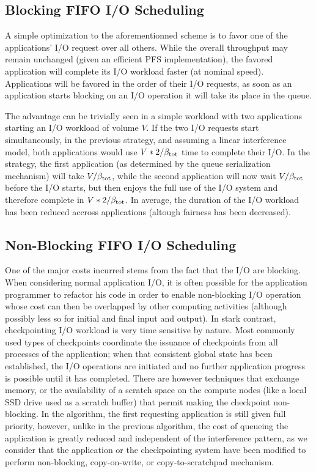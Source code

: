 \subsection{Blocking FIFO I/O Scheduling}

A simple optimization to the aforementionned scheme is to favor one of
the applications' I/O request over all others. While the overall throughput
may remain unchanged (given an efficient PFS implementation), the favored
application will complete its I/O workload faster (at nominal speed).
Applications will be favored in the order of their I/O requests, \ie
as soon as an application starts blocking on an I/O operation it will
take its place in the queue.

The advantage can be trivially seen in a simple workload with two applications
starting an I/O workload of volume $V$. If the two I/O requests
start simultaneously, in the previous strategy, and assuming a linear
interference model, both applications would use $V*2/\beta_{\text{tot}}$ time
to complete their I/O. In the \fifoblock strategy, the first application
(as determined by the queue serialization mechanism)
will take $V/\beta_{\text{tot}}$, while the second application will now wait
$V/\beta_{\text{tot}}$ before the I/O starts, but then enjoys the full use of
the I/O system and therefore complete in $V*2/\beta_{\text{tot}}$. In
average, the duration of the I/O workload has been reduced accross
applications (altough fairness has been decreased).

\subsection{Non-Blocking FIFO I/O Scheduling}

One of the major costs incurred stems from the fact that the I/O are
blocking. When considering normal application I/O, it is often
possible for the application programmer to refactor his code in order
to enable non-blocking I/O operation whose cost can then be
overlapped by other computing activities (although possibly less so
for initial and final input and output). In stark contrast,
checkpointing I/O workload is very time sensitive by nature.
Most commonly used types of checkpoints coordinate the
issuance of checkpoints from all processes of the application; when
that consistent global state has been established, the I/O operations
are initiated and no further application progress is possible until
it has completed. There are however techniques that exchange memory,
or the availability of a scratch space on the compute nodes (like a
local SSD drive used as a scratch buffer) that permit making the
checkpoint non-blocking. In the \fifononblock algorithm, the first
requesting application is still given full priority, however, unlike
in the previous algorithm, the cost of queueing the application is
greatly reduced and independent of the interference pattern, as we
consider that the application or the checkpointing system have been
modified to perform non-blocking, copy-on-write, or copy-to-scratchpad
mechanism.

